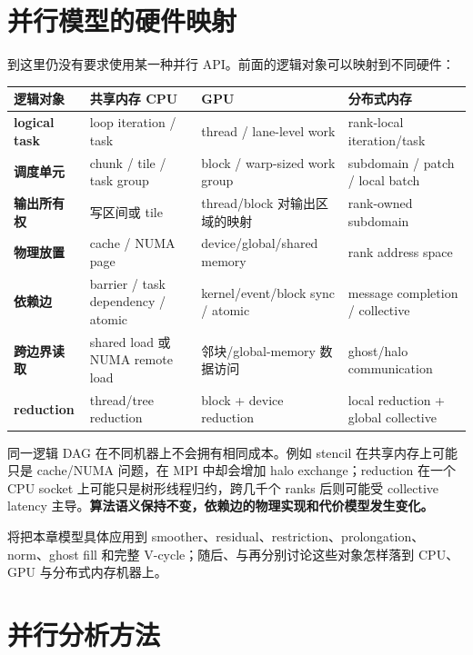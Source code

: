 \section{并行模型的硬件映射}

到这里仍没有要求使用某一种并行 API。前面的逻辑对象可以映射到不同硬件：
\begin{center}
\small
\begin{tabularx}{0.97\textwidth}{>{\bfseries}p{2.8cm}XXX}
\toprule
逻辑对象 & 共享内存 CPU & GPU & 分布式内存\\
\midrule
logical task & loop iteration / task & thread / lane-level work & rank-local iteration/task\\
调度单元 & chunk / tile / task group & block / warp-sized work group & subdomain / patch / local batch\\
输出所有权 & 写区间或 tile & thread/block 对输出区域的映射 & rank-owned subdomain\\
物理放置 & cache / NUMA page & device/global/shared memory & rank address space\\
依赖边 & barrier / task dependency / atomic & kernel/event/block sync / atomic & message completion / collective\\
跨边界读取 & shared load 或 NUMA remote load & 邻块/global-memory 数据访问 & ghost/halo communication\\
reduction & thread/tree reduction & block + device reduction & local reduction + global collective\\
\bottomrule
\end{tabularx}
\end{center}

同一逻辑 DAG 在不同机器上不会拥有相同成本。例如 stencil 在共享内存上可能只是 cache/NUMA 问题，在 MPI 中却会增加 halo exchange；reduction 在一个 CPU socket 上可能只是树形线程归约，跨几千个 ranks 后则可能受 collective latency 主导。\textbf{算法语义保持不变，依赖边的物理实现和代价模型发生变化。}

将把本章模型具体应用到 smoother、residual、restriction、prolongation、norm、ghost fill 和完整 V-cycle；随后、与再分别讨论这些对象怎样落到 CPU、GPU 与分布式内存机器上。

\section{并行分析方法}

